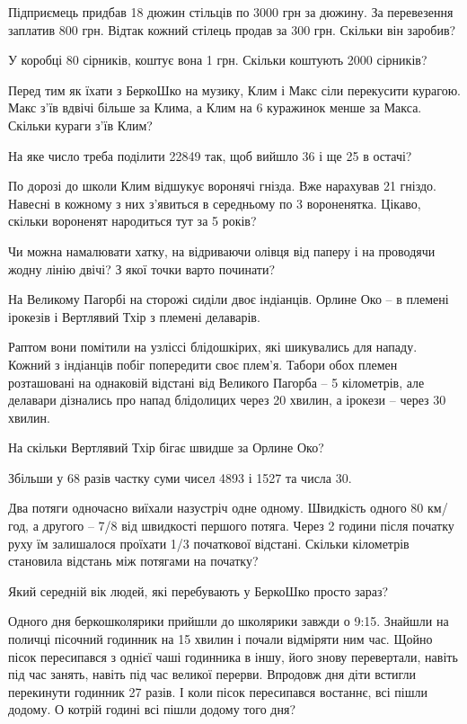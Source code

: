 \problem
Підприємець придбав 18 дюжин стільців по 3000 грн за дюжину.
За перевезення заплатив 800 грн.
Відтак кожний стілець продав за 300 грн.
Скільки він заробив?


\problem
У коробці 80 сірників, коштує вона 1 грн.
Скільки коштують 2000 сірників?


\problem
Перед тим як їхати з БеркоШко на музику, Клим і Макс сіли перекусити курагою.
Макс з’їв вдвічі більше за Клима, а Клим на 6 куражинок менше за Макса.
Скільки кураги з’їв Клим?


\problem
На яке число треба поділити 22849 так, щоб вийшло 36 і ще 25 в остачі?


\problem
По дорозі до школи Клим відшукує воронячі гнізда. Вже нарахував 21 гніздо.
Навесні в кожному з них з’явиться в середньому по 3 вороненятка.
Цікаво, скільки вороненят народиться тут за 5 років?


\problem
Чи можна намалювати хатку, на відриваючи олівця від паперу і на проводячи
жодну лінію двічі?
З якої точки варто починати?


\problem
На Великому Пагорбі на сторожі сиділи двоє індіанців.
Орлине Око – в племені ірокезів і Вертлявий Тхір з племені делаварів.

Раптом вони помітили на узліссі блідошкірих, які шикувались для нападу.
Кожний з індіанців побіг попередити своє плем’я.
Табори обох племен розташовані на однаковій відстані від Великого Пагорба –
5 кілометрів, але делавари дізнались про напад блідолицих через 20 хвилин,
а ірокези – через 30 хвилин.

На скільки Вертлявий Тхір бігає швидше за Орлине Око?


\problem
Збільши у 68 разів частку суми чисел 4893 і 1527 та числа 30.


\problem
Два потяги одночасно виїхали назустріч одне одному.
Швидкість одного 80 км/год, а другого – 7/8 від швидкості першого потяга.
Через 2 години після початку руху їм залишалося проїхати
1/3 початкової відстані.
Скільки кілометрів становила відстань між потягами на початку?


\problem
Який середній вік людей, які перебувають у БеркоШко просто зараз?


\problem
Одного дня беркошколярики прийшли до школярики завжди о 9:15.
Знайшли на поличці пісочний годинник на 15 хвилин і почали відміряти ним час.
Щойно пісок пересипався з однієї чаші годинника в іншу,
його знову перевертали, навіть під час занять,
навіть під час великої перерви.
Впродовж дня діти встигли перекинути годинник 27 разів.
І коли пісок пересипався востаннє, всі пішли додому.
О котрій годині всі пішли додому того дня?


